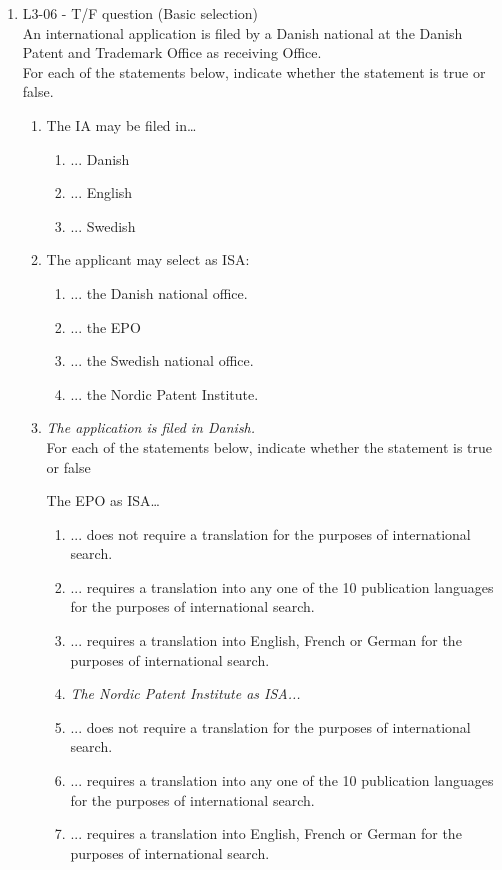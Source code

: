 \documentclass{report}
\begin{document}
\begin{enumerate}[label=\textbf{Question \arabic*}]

    \item %
    L3-06 - T/F question (Basic selection) \\
    An international application is filed by a Danish national at the Danish Patent and Trademark Office as receiving Office. \\
    For each of the statements below, indicate whether the statement is true or false.
    \begin{enumerate}[label=(\alph*)]
        \item The IA may be filed in…
        \begin{enumerate}[label={(\alph{enumi}.\arabic*)}]
            \item ... Danish
            \item ... English
            \item ... Swedish
        \end{enumerate}

        \item The applicant may select as ISA:
        \begin{enumerate}[label={(\alph{enumi}.\arabic*)}]
            \item ... the Danish national office.
            \item ... the EPO
            \item ... the Swedish national office.
            \item ... the Nordic Patent Institute.
        \end{enumerate}
        
        \item \textit{The application is filed in Danish.} \\
        For each of the statements below, indicate whether the statement is true or false
        
        \vspace{0.5em}
        The EPO as ISA…
        \begin{enumerate}[label={(\alph{enumi}.\arabic*)}]
            \item ... does not require a translation for the purposes of international search.
            \item ... requires a translation into any one of the 10 publication languages for the purposes of international search.
            \item ... requires a translation into English, French or German for the purposes of international search.
            \item[] \textit{The Nordic Patent Institute as ISA...}
            \item ... does not require a translation for the purposes of international search.
            \item ... requires a translation into any one of the 10 publication languages for the purposes of international search.
            \item ... requires a translation into English, French or German for the purposes of international search.
        \end{enumerate}


\end{enumerate}
\end{enumerate}
\end{document}
